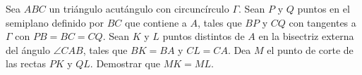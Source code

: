Sea $ABC$ un triángulo acutángulo con circuncírculo $\Gamma$. Sean $P$ y $Q$ puntos en el semiplano definido por $BC$ que contiene a $A$, tales que $BP$ y $CQ$ con tangentes a $\Gamma$ con $PB=BC=CQ$. Sean $K$ y $L$ puntos distintos de $A$ en la bisectriz externa del ángulo $\angle CAB$, tales que $BK=BA$ y $CL=CA$. Dea $M$ el punto de corte de las rectas $PK$ y $QL$. Demostrar que $MK=ML$.